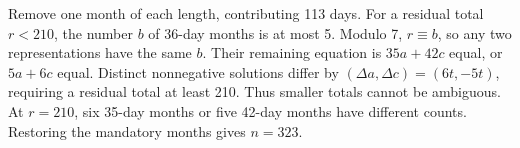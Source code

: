 Remove one month of each length, contributing 113 days. For a residual total $r<210$, the number $b$ of 36-day months is at most 5. Modulo 7, $r\equiv b$, so any two representations have the same $b$. Their remaining equation is $35a+42c$ equal, or $5a+6c$ equal. Distinct nonnegative solutions differ by $(\Delta a,\Delta c)=(6t,-5t)$, requiring a residual total at least 210. Thus smaller totals cannot be ambiguous. At $r=210$, six 35-day months or five 42-day months have different counts. Restoring the mandatory months gives $\boxed{n=323}$.
